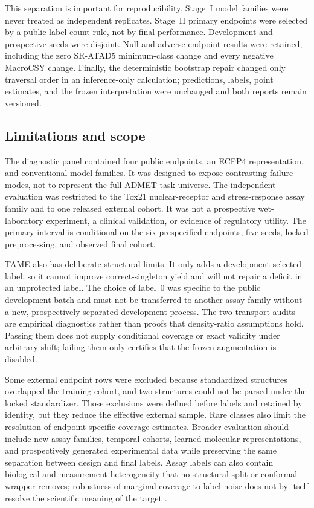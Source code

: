 This separation is important for reproducibility. Stage~I model families were never treated as independent replicates. Stage~II primary endpoints were selected by a public label-count rule, not by final performance. Development and prospective seeds were disjoint. Null and adverse endpoint results were retained, including the zero SR-ATAD5 minimum-class change and every negative MacroCSY change. Finally, the deterministic bootstrap repair changed only traversal order in an inference-only calculation; predictions, labels, point estimates, and the frozen interpretation were unchanged and both reports remain versioned.

\subsection{Limitations and scope}

The diagnostic panel contained four public endpoints, an ECFP4 representation, and conventional model families. It was designed to expose contrasting failure modes, not to represent the full ADMET task universe. The independent evaluation was restricted to the Tox21 nuclear-receptor and stress-response assay family and to one released external cohort. It was not a prospective wet-laboratory experiment, a clinical validation, or evidence of regulatory utility. The primary interval is conditional on the six prespecified endpoints, five seeds, locked preprocessing, and observed final cohort.

TAME also has deliberate structural limits. It only adds a development-selected label, so it cannot improve correct-singleton yield and will not repair a deficit in an unprotected label. The choice of label~0 was specific to the public development batch and must not be transferred to another assay family without a new, prospectively separated development process. The two transport audits are empirical diagnostics rather than proofs that density-ratio assumptions hold. Passing them does not supply conditional coverage or exact validity under arbitrary shift; failing them only certifies that the frozen augmentation is disabled.

Some external endpoint rows were excluded because standardized structures overlapped the training cohort, and two structures could not be parsed under the locked standardizer. Those exclusions were defined before labels and retained by identity, but they reduce the effective external sample. Rare classes also limit the resolution of endpoint-specific coverage estimates. Broader evaluation should include new assay families, temporal cohorts, learned molecular representations, and prospectively generated experimental data while preserving the same separation between design and final labels.
Assay labels can also contain biological and measurement heterogeneity that no structural split or conformal wrapper removes; robustness of marginal coverage to label noise does not by itself resolve the scientific meaning of the target \citep{einbinder2023labelnoise}.


